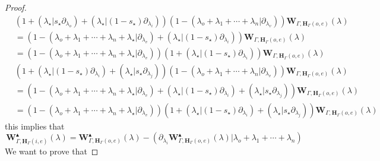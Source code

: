 \documentclass[11pt]{amsart}
\theoremstyle{definition}
\theoremstyle{remark}
\numberwithin{equation}{section}
\begin{document}
\begin{proof}
\begin{align*}
   & \left(1+(\lambda_{\star}|s_{\star}\partial_{\lambda_o})+(\lambda_{\star}|(1-s_{\star})\partial_{\lambda_i})\right)\left(1-(\lambda_o+\lambda_1+\cdots+\lambda_n|\partial_{\lambda_v})\right)\mathbf{W}_{\Gamma,\mathbf{H}_{\Gamma}(o,e)}(\lambda) \\
   &=\left(1-(\lambda_o+\lambda_1+\cdots+\lambda_n+\lambda_{\star}|\partial_{\lambda_v})+(\lambda_{\star}|(1-s_{\star})\partial_{\lambda_i})\right)\mathbf{W}_{\Gamma,\mathbf{H}_{\Gamma}(o,e)}(\lambda)\\
   &= \left(1-(\lambda_o+\lambda_1+\cdots+\lambda_n+\lambda_{\star}|\partial_{\lambda_v})\right)\left(1+(\lambda_{\star}|(1-s_{\star})\partial_{\lambda_i})\right)\mathbf{W}_{\Gamma,\mathbf{H}_{\Gamma}(o,e)}(\lambda)
\end{align*}
\begin{align*}
   & \left(1+(\lambda_{\star}|(1-s_{\star})\partial_{\lambda_i})+(\lambda_{\star}|s_{\star}\partial_{\lambda_j})\right)\left(1-(\lambda_o+\lambda_1+\cdots+\lambda_n|\partial_{\lambda_v})\right)\mathbf{W}_{\Gamma,\mathbf{H}_{\Gamma}(o,e)}(\lambda) \\
   &=\left(1-(\lambda_o+\lambda_1+\cdots+\lambda_n+\lambda_{\star}|\partial_{\lambda_v})+(\lambda_{\star}|(1-s_{\star})\partial_{\lambda_i})+(\lambda_{\star}|s_{\star}\partial_{\lambda_j})\right)\mathbf{W}_{\Gamma,\mathbf{H}_{\Gamma}(o,e)}(\lambda)\\
   &= \left(1-(\lambda_o+\lambda_1+\cdots+\lambda_n+\lambda_{\star}|\partial_{\lambda_v})\right)\left(1+(\lambda_{\star}|(1-s_{\star})\partial_{\lambda_i})+(\lambda_{\star}|s_{\star}\partial_{\lambda_j})\right)\mathbf{W}_{\Gamma,\mathbf{H}_{\Gamma}(o,e)}(\lambda)
\end{align*}
\iffalse
this implies that
$$
\mathbf{W}^{\blacktriangle}_{\Gamma,\mathbf{H}_{\Gamma}(i,e)}(\lambda)=\mathbf{W}^{\blacktriangle}_{\Gamma,\mathbf{H}_{\Gamma}(o,e)}(\lambda)-\left(\partial_{\lambda_i}\mathbf{W}^{\blacktriangle}_{\Gamma,\mathbf{H}_{\Gamma}(o,e)}(\lambda)|\lambda_o+\lambda_1+\cdots+\lambda_n\right)
$$
We want to prove that


\end{proof}
\end{document}
